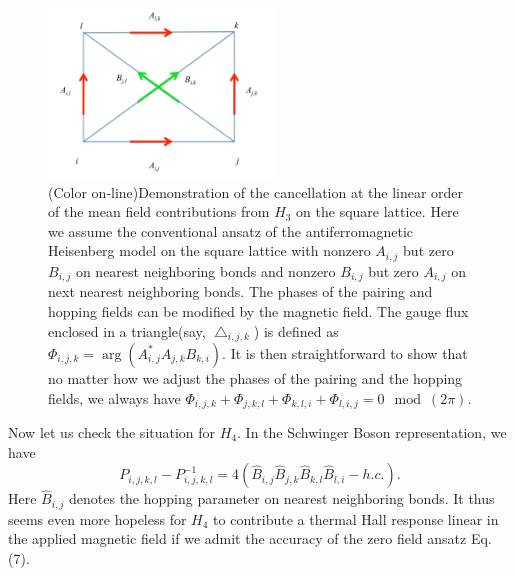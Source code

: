 \documentclass[prb,twocolumn,showpacs]{revtex4}
\begin{document}
\begin{figure}
\includegraphics[width=6cm]{cancel.pdf}
\caption{\label{fig1}
(Color on-line)Demonstration of the cancellation at the linear order of the mean field contributions from $H_{3}$ on the square lattice. Here we assume the conventional ansatz of the antiferromagnetic Heisenberg model on the square lattice with nonzero $A_{i,j}$ but zero $B_{i,j}$ on nearest neighboring bonds and nonzero $B_{i,j}$ but zero $A_{i,j}$ on next nearest neighboring bonds. The phases of the pairing and hopping fields can be modified by the magnetic field. The gauge flux enclosed in a triangle(say, $\bigtriangleup_{i,j,k}$) is defined as $\Phi_{i,j,k}=\arg(A^{*}_{i,j}A_{j,k}B_{k,i})$. It is then straightforward to show that no matter how we adjust the phases of the pairing and the hopping fields, we always have $\Phi_{i,j,k}+\Phi_{j,k,l}+\Phi_{k,l,i}+\Phi_{l,i,j}=0\mod(2\pi)$.}
\end{figure}
Now let us check the situation for $H_{4}$.  In the Schwinger Boson representation, we have
\begin{equation}
P_{i,j,k,l}-P^{-1}_{i,j,k,l}=4(\hat{B}_{i,j}\hat{B}_{j,k}\hat{B}_{k,l}\hat{B}_{l,i}-h.c.).
\end{equation}
Here $\hat{B}_{i,j}$ denotes the hopping parameter on nearest neighboring bonds. It thus seems even more hopeless for $H_{4}$ to contribute a thermal Hall response linear in the applied magnetic field if we admit the accuracy of the zero field ansatz Eq.(7).
\end{document}
